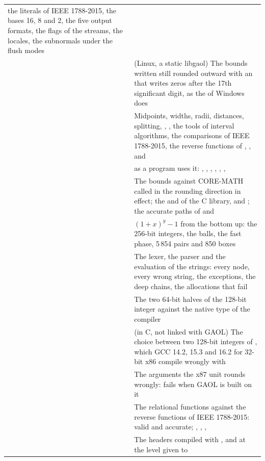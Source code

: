 \begin{longtable}{L{4.4cm}L{9.4cm}}
    the literals of IEEE 1788-2015, the bases 16, 8 and 2, the five output
    formats, the flags of the streams, the locales, the subnormals under
    the flush modes\\
   & (Linux, a static libgaol) The bounds written still
    rounded outward with an  that writes zeros after the
    17th significant digit, as the  of Windows does\\
   & Midpoints, widths, radii, distances, splitting,
    , , the tools of interval algorithms, the
    comparisons of IEEE 1788-2015, the reverse functions of ,
    ,  and \\
   &  as a program uses it: ,
    , , , ,
    , \\
   & The bounds against CORE-MATH called in the rounding
    direction in effect; the  and  of the C library, and
    ; the accurate paths of  and
    \\
   & $(1+x)^y-1$ from the bottom up: the 256-bit integers,
    the balls, the fast phase, 5\,854 pairs and 850 boxes\\
   & The lexer, the parser and the evaluation of the
    strings: every node, every wrong string, the exceptions, the deep
    chains, the allocations that fail\\
   & The two 64-bit halves of the 128-bit integer against the
    native type of the compiler\\
   & (in C, not linked with GAOL) The choice between two
    128-bit integers of , which GCC 14.2, 15.3
    and 16.2 for 32-bit x86 compile wrongly with \\
   & The arguments the x87 unit rounds wrongly:
    fails when GAOL is built on it\\
   & The relational functions against the reverse functions
    of IEEE 1788-2015: valid and accurate; ,
    , , \\
   & The headers compiled with , and
     at the level given to \\

\end{longtable}
